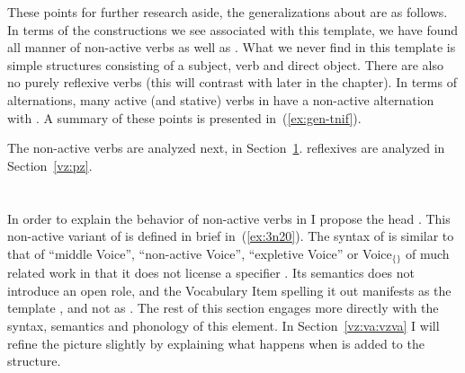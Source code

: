 \begin{exe}
\begin{xlist}
\begin{xlist}
\begin{exe}
\begin{xlist}
\begin{xlist}
\begin{exe}
\begin{xlist}
\begin{xlist}
\begin{exe}
\begin{exe}
\begin{xlist}
\begin{exe}
\begin{exe}
\begin{xlist}
\begin{exe}
\begin{exe}
\begin{exe}
\begin{exe}
\begin{exe}
\begin{xlist}
\begin{exe}
\begin{xlist}
\begin{exe}
\begin{exe}
\begin{xlist}
These points for further research aside, the generalizations about {\tnif} are as follows. In terms of the constructions we see associated with this template, we have found all manner of non-active verbs as well as . What we never find in this template is simple  structures consisting of a subject, verb and direct object. There are also no purely reflexive verbs (this will contrast with {\thit} later in the chapter). In terms of alternations, many active (and stative) verbs in {\tkal} have a non-active alternation with {\tnif}. A summary of these points is presented in~(\ref{ex:gen-tnif}).


The non-active verbs are analyzed next, in Section~\ref{vz:vz}.  reflexives are analyzed in Section~\ref{vz:pz}.


\section{\vz} \label{vz:vz}
In order to explain the behavior of non-active verbs in {\tnif} I propose the head {\vz}. This non-active variant of  is defined in brief in~(\ref{ex:3n20}). The syntax of {\vz} is similar to that of ``middle Voice'', ``non-active Voice'', ``expletive Voice'' or Voice$_{\{\}}$ of much related work in that it does not license a specifier \citep{lidz01,schaefer08,alexiadoudoron12,layering15,bruening13,wood15springer,myler16mit,kastnerzu17}. Its semantics does not introduce an open  role, and the Vocabulary Item spelling it out manifests as the template {\tnif}, and not as {\tkal}. The rest of this section engages more directly with the syntax, semantics and phonology of this element. In Section~\ref{vz:va:vzva} I will refine the picture slightly by explaining what happens when {\va} is added to the structure.


\end{xlist}
\end{exe}
\end{exe}
\end{xlist}
\end{exe}
\end{xlist}
\end{exe}
\end{exe}
\end{exe}
\end{exe}
\end{exe}
\end{xlist}
\end{exe}
\end{exe}
\end{xlist}
\end{exe}
\end{exe}
\end{xlist}
\end{xlist}
\end{exe}
\end{xlist}
\end{xlist}
\end{exe}
\end{xlist}
\end{xlist}
\end{exe}
